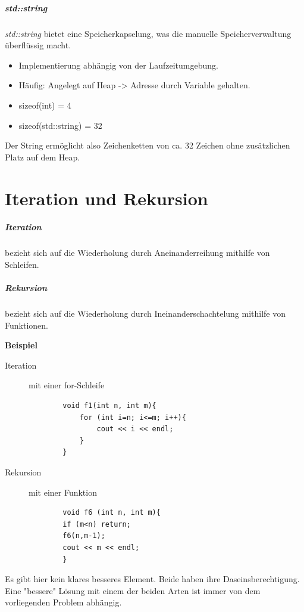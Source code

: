 \documentclass{book}
\begin{document}
\paragraph{std::string} \textit{std::string} bietet eine Speicherkapselung, was die manuelle Speicherverwaltung
überflüssig macht. 
\begin{itemize}
	\item Implementierung abhängig von der Laufzeitumgebung.
	\item Häufig: Angelegt auf Heap -> Adresse durch Variable gehalten. 
\end{itemize}
\begin{tcolorbox}
	\begin{itemize}
		\item sizeof(int) = 4
		\item sizeof(std::string) = 32
	\end{itemize}
	Der String ermöglicht also Zeichenketten von ca. 32 Zeichen ohne zusätzlichen Platz auf dem Heap.
\end{tcolorbox}
\chapter{Iteration und Rekursion}
\paragraph{Iteration} bezieht sich auf die Wiederholung durch Aneinanderreihung mithilfe von Schleifen.
\paragraph{Rekursion} bezieht sich auf die Wiederholung durch Ineinanderschachtelung mithilfe von Funktionen.
\begin{tcolorbox}
	\textbf{Beispiel}
	\begin{description}
		\item [Iteration] mit einer for-Schleife
	
	\begin{verbatim}
		void f1(int n, int m){
			for (int i=n; i<=m; i++){
				cout << i << endl;
			}
		}
	\end{verbatim}
	\item[Rekursion] mit einer Funktion
	\begin{verbatim}
		void f6 (int n, int m){
		if (m<n) return;
		f6(n,m-1);
		cout << m << endl;
		}
	\end{verbatim}
\end{description}
\end{tcolorbox}
Es gibt hier kein klares besseres Element. Beide haben ihre Daseinsberechtigung. 
Eine "bessere" Lösung mit einem der beiden Arten ist immer von dem vorliegenden Problem abhängig.
\end{document}
